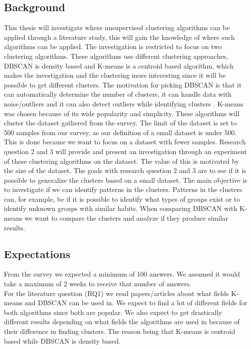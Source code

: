 \documentclass[a4paper]{article}
\begin{document}
\subsection{Background}
This thesis will investigate where unsupervised clustering algorithms can be applied through a literature study, this will gain the knowledge of where such algorithms can be applied. The investigation is restricted to focus on two clustering algorithms. These algorithms use different clustering approaches, DBSCAN is density based and K-means is a centroid based algorithm, which makes the investigation and the clustering more interesting since it will be possible to get different clusters. The motivation for picking DBSCAN is that it can automatically determine the number of clusters, it can handle data with noise/outliers and it can also detect outliers while identifying clusters \cite{airplane}. K-means was chosen because of its wide popularity and simplicity. These algorithms will cluster the dataset gathered from the survey. The limit of the dataset is set to 500 samples from our survey, as our definition of a small dataset is under 500. This is done because we want to focus on a dataset with fewer samples. Research question 2 and 3 will provide and present an investigation through an experiment of these clustering algorithms on the dataset. The value of this is motivated by the size of the dataset. The goals with research question 2 and 3 are to see if it is possible to generalize the clusters based on a small dataset. The main objective is to investigate if we can identify patterns in the clusters. Patterns in the clusters can, for example, be if it is possible to identify what types of groups exist or to identify unknown groups with similar habits. When comparing DBSCAN with K-means we want to compare the clusters and analyze if they produce similar results. 

\subsection{Expectations}
From the survey we expected a minimum of 100 answers. We assumed it would take a maximum of 2 weeks to receive that number of answers. \newline\\
For the literature question (RQ1) we read papers/articles about what fields K-means and DBSCAN can be used in. We expect to find a lot of different fields for both algorithms since both are popular. We also expect to get drastically different results depending on what fields the algorithms are used in because of their difference in finding clusters. The reason being that K-means is centroid based while DBSCAN is density based. 
\end{document}
